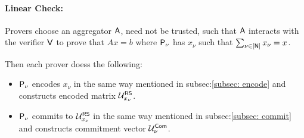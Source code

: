 \paragraph{Linear Check: }
Provers choose an aggregator $\mathsf{A}$, need not be trusted, such that $\mathsf{A}$ interacts with the verifier $\mathsf{V}$ to prove that $Ax=b$ where $\mathsf{P}_{\nu}$ has $x_{\nu}$ such that $\sum_{\nu\in[\mathsf{N}]} x_{\nu}=x$.

Then each prover doess the following:
\begin{itemize}
	\item $\mathsf{P}_{\nu}$ encodes $x_{\nu}$ in the same way mentioned in subsec:\ref{subsec: encode} and constructs encoded matrix $\mathcal{U}^{\mathsf{RS}}_{x_{\nu}}$.
	\item $\mathsf{P}_{\nu}$ commits to $\mathcal{U}^{\mathsf{RS}}_{x_{\nu}}$ in the same way mentioned in subsec:\ref{subsec: commit} and constructs commitment vector $\mathcal{U}^{\mathsf{Com}}_{\nu}$.
\end{itemize}

